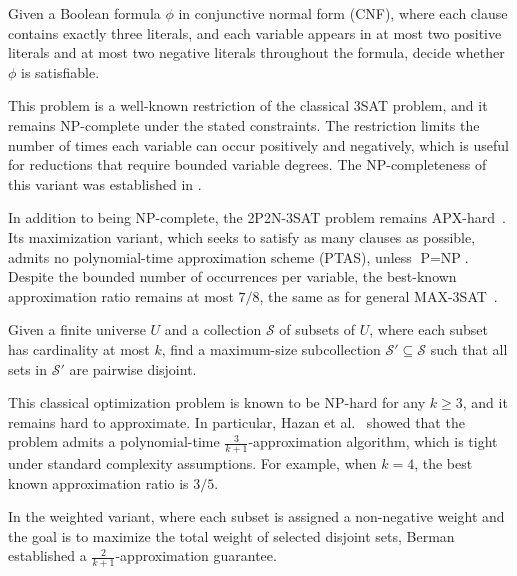 \begin{problem}[2P2N-3SAT]
\label{prob:2p2n_3sat}
Given a Boolean formula $\phi$ in conjunctive normal form (CNF), where each clause contains exactly three literals, and each variable appears in at most two positive literals and at most two negative literals throughout the formula, decide whether $\phi$ is satisfiable.
\end{problem}

This problem is a well-known restriction of the classical \textsc{3SAT} problem, and it remains NP-complete under the stated constraints. The restriction limits the number of times each variable can occur positively and negatively, which is useful for reductions that require bounded variable degrees. The NP-completeness of this variant was established in \cite{berman2003restricted}.

In addition to being NP-complete, the \textsc{2P2N-3SAT} problem remains APX-hard~\cite{berman2003restricted}. Its maximization variant, which seeks to satisfy as many clauses as possible, admits no polynomial-time approximation scheme (PTAS), unless $\text{P} = \text{NP}$. Despite the bounded number of occurrences per variable, the best-known approximation ratio remains at most $7/8$, the same as for general \textsc{MAX-3SAT}~\cite{hazan2006complexity}.


\begin{problem}
Given a finite universe $U$ and a collection $\mathcal{S}$ of subsets of $U$, where each subset has cardinality at most $k$, find a maximum-size subcollection $\mathcal{S}' \subseteq \mathcal{S}$ such that all sets in $\mathcal{S}'$ are pairwise disjoint.
\end{problem}

This classical optimization problem is known to be NP-hard for any $k \geq 3$, and it remains hard to approximate. In particular, Hazan et al.~\cite{hazan2006complexity} showed that the problem admits a polynomial-time $\frac{3}{k+1}$-approximation algorithm, which is tight under standard complexity assumptions. For example, when $k=4$, the best known approximation ratio is $3/5$.

In the weighted variant, where each subset is assigned a non-negative weight and the goal is to maximize the total weight of selected disjoint sets, Berman~\cite{berman2000packing} established a $\frac{2}{k+1}$-approximation guarantee.



